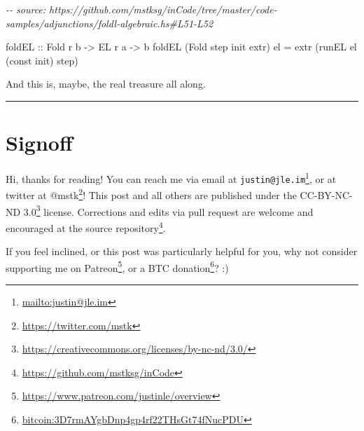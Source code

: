 \documentclass[]{article}
\newenvironment{Shaded}{}{}
\newcommand{\CommentTok}[1]{\textcolor[rgb]{0.38,0.63,0.69}{\textit{#1}}}
\newcommand{\DataTypeTok}[1]{\textcolor[rgb]{0.56,0.13,0.00}{#1}}
\newcommand{\FunctionTok}[1]{\textcolor[rgb]{0.02,0.16,0.49}{#1}}
\newcommand{\NormalTok}[1]{#1}
\newcommand{\OtherTok}[1]{\textcolor[rgb]{0.00,0.44,0.13}{#1}}
\renewcommand{\href}[2]{#2\footnote{\url{#1}}}
\begin{document}
\begin{Shaded}
\begin{Highlighting}[]
\CommentTok{{-}{-} source: https://github.com/mstksg/inCode/tree/master/code{-}samples/adjunctions/foldl{-}algebraic.hs\#L51{-}L52}

\OtherTok{foldEL ::} \DataTypeTok{Fold}\NormalTok{ r b }\OtherTok{{-}>} \DataTypeTok{EL}\NormalTok{ r a }\OtherTok{{-}>}\NormalTok{ b}
\NormalTok{foldEL (}\DataTypeTok{Fold}\NormalTok{ step }\FunctionTok{init}\NormalTok{ extr) el }\OtherTok{=}\NormalTok{ extr (runEL el (}\FunctionTok{const} \FunctionTok{init}\NormalTok{) step)}
\end{Highlighting}
\end{Shaded}

And this is, maybe, the real treasure all along.

\begin{center}\rule{0.5\linewidth}{\linethickness}\end{center}

\hypertarget{signoff}{%
\section{Signoff}\label{signoff}}

Hi, thanks for reading! You can reach me via email at
\href{mailto:justin@jle.im}{\nolinkurl{justin@jle.im}}, or at twitter at
\href{https://twitter.com/mstk}{@mstk}! This post and all others are published
under the \href{https://creativecommons.org/licenses/by-nc-nd/3.0/}{CC-BY-NC-ND
3.0} license. Corrections and edits via pull request are welcome and encouraged
at \href{https://github.com/mstksg/inCode}{the source repository}.

If you feel inclined, or this post was particularly helpful for you, why not
consider \href{https://www.patreon.com/justinle/overview}{supporting me on
Patreon}, or a \href{bitcoin:3D7rmAYgbDnp4gp4rf22THsGt74fNucPDU}{BTC donation}?
:)
\end{document}
